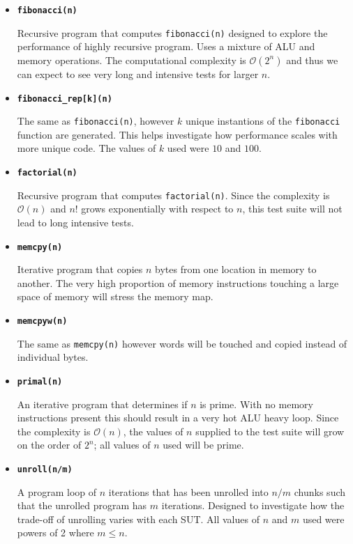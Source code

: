 \begin{itemize}
    \item \textbf{\texttt{fibonacci(n)}}
    
    Recursive program that computes \texttt{fibonacci(n)} designed to explore the performance of highly recursive program. Uses a mixture of ALU and memory operations. The computational complexity is $\mathcal{O}(2^n)$ and thus we can expect to see very long and intensive tests for larger $n$.
    
    \item \textbf{\texttt{fibonacci\_rep[k](n)}}
    
    The same as \texttt{fibonacci(n)}, however $k$ unique instantions of the \texttt{fibonacci} function are generated. This helps investigate how performance scales with more unique code. The values of $k$ used were $10$ and $100$.
    
    \item \textbf{\texttt{factorial(n)}}
    
    Recursive program that computes \texttt{factorial(n)}. Since the complexity is $\mathcal{O}(n)$ and $n!$ grows exponentially with respect to $n$, this test suite will not lead to long intensive tests.

    \item \textbf{\texttt{memcpy(n)}}
    
    Iterative program that copies $n$ bytes from one location in memory to another. The very high proportion of memory instructions touching a large space of memory will stress the memory map.
    
    \item \textbf{\texttt{memcpyw(n)}}
    
    The same as \texttt{memcpy(n)} however words will be touched and copied instead of individual bytes.
    
    \item \textbf{\texttt{primal(n)}}
    
    An iterative program that determines if $n$ is prime. With no memory instructions present this should result in a very hot ALU heavy loop. Since the complexity is $\mathcal{O}(n)$, the values of $n$ supplied to the test suite will grow on the order of $2^n$; all values of $n$ used will be prime.
    
    \item \textbf{\texttt{unroll(n/m)}}
    
    A program loop of $n$ iterations that has been unrolled into $n/m$ chunks such that the unrolled program has $m$ iterations. Designed to investigate how the trade-off of unrolling varies with each SUT. All values of $n$ and $m$ used were powers of 2 where $m \leq n$.
\end{itemize}








